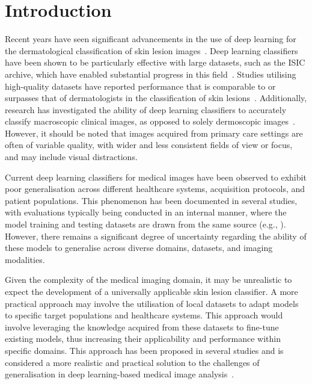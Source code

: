 \section{Introduction}
\label{sec:generalisation_intro}
Recent years have seen significant advancements in the use of deep learning for the dermatological classification of skin lesion images~\citep{du2020ai,wu2022skin}. Deep learning classifiers have been shown to be particularly effective with large datasets, such as the ISIC archive, which have enabled substantial progress in this field~\citep{tschandl2018ham10000,wen2021characteristics}. Studies utilising high-quality datasets have reported performance that is comparable to or surpasses that of dermatologists in the classification of skin lesions~\citep{esteva2017dermatologist,haenssle2018man,han2018classification,tschandl2019expert}. Additionally, research has investigated the ability of deep learning classifiers to accurately classify macroscopic clinical images, as opposed to solely dermoscopic images~\citep{fujisawa2019deep}. However, it should be noted that images acquired from primary care settings are often of variable quality, with wider and less consistent fields of view or focus, and may include visual distractions.

Current deep learning classifiers for medical images have been observed to exhibit poor generalisation across different healthcare systems, acquisition protocols, and patient populations. This phenomenon has been documented in several studies, with evaluations typically being conducted in an internal manner, where the model training and testing datasets are drawn from the same source (e.g., \cite{han2018classification}). However, there remains a significant degree of uncertainty regarding the ability of these models to generalise across diverse domains, datasets, and imaging modalities. 

Given the complexity of the medical imaging domain, it may be unrealistic to expect the development of a universally applicable skin lesion classifier. A more practical approach may involve the utilisation of local datasets to adapt models to specific target populations and healthcare systems. This approach would involve leveraging the knowledge acquired from these datasets to fine-tune existing models, thus increasing their applicability and performance within specific domains. This approach has been proposed in several studies and is considered a more realistic and practical solution to the challenges of generalisation in deep learning-based medical image analysis~\citep{glocker2022risk}. 

